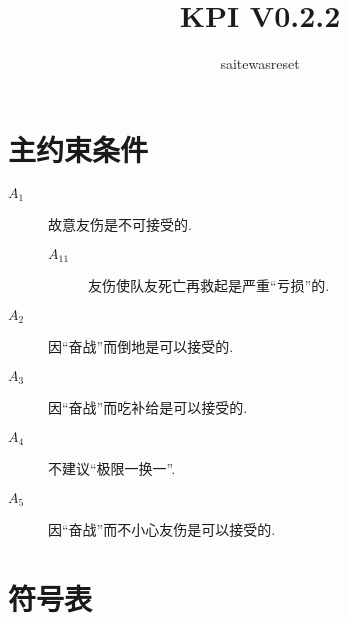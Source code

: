 \documentclass{ctexart}
\begin{document}
\title{KPI V0.2.2}
\author{saitewasreset}

\maketitle

\tableofcontents

\section{主约束条件}

\begin{description}
    \item[$A_1$] 故意友伤是不可接受的.
          \begin{description}
              \item[$A_{11}$] 友伤使队友死亡再救起是严重“亏损”的.
          \end{description}
    \item[$A_2$] 因“奋战”而倒地是可以接受的.
    \item[$A_3$] 因“奋战”而吃补给是可以接受的.
    \item[$A_4$] 不建议“极限一换一”.
    \item[$A_5$] 因“奋战”而不小心友伤是可以接受的.
\end{description}

\section{符号表}
\end{document}
